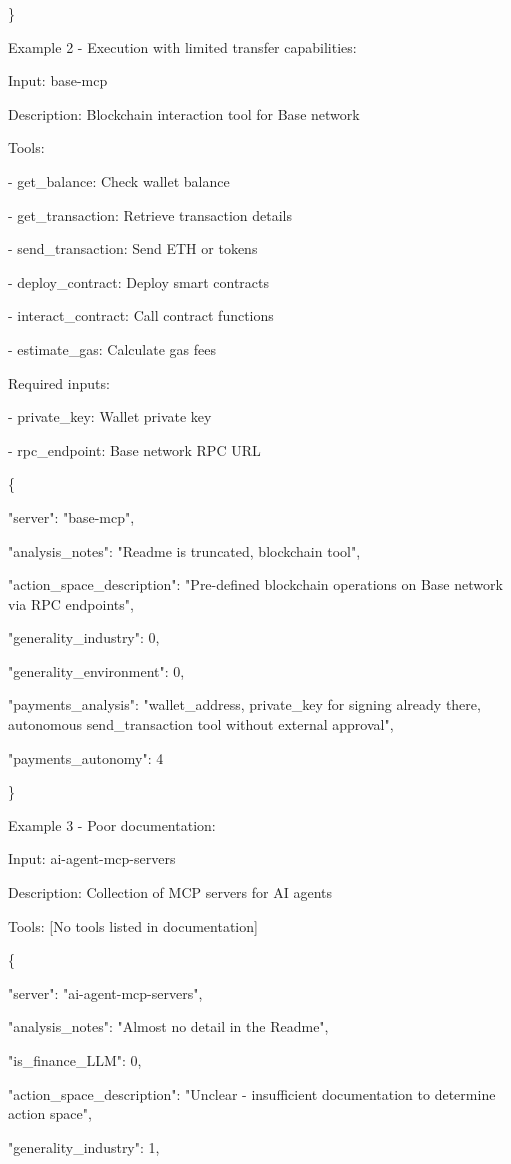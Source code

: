 \documentclass[manuscript,screen,nonacm,oneside]{acmart}
\begin{document}
\}

Example 2 - Execution with limited transfer capabilities:

Input: base-mcp

Description: Blockchain interaction tool for Base network

Tools:

- get\_balance: Check wallet balance

- get\_transaction: Retrieve transaction details

- send\_transaction: Send ETH or tokens

- deploy\_contract: Deploy smart contracts

- interact\_contract: Call contract functions

- estimate\_gas: Calculate gas fees

Required inputs:

- private\_key: Wallet private key

- rpc\_endpoint: Base network RPC URL

\{

"server": "base-mcp",

"analysis\_notes": "Readme is truncated, blockchain tool",

"action\_space\_description": "Pre-defined blockchain operations on Base network via RPC endpoints",

"generality\_industry": 0,

"generality\_environment": 0,

"payments\_analysis": "wallet\_address, private\_key for signing already there, autonomous send\_transaction tool without external approval",

"payments\_autonomy": 4

\}

Example 3 - Poor documentation:

Input: ai-agent-mcp-servers

Description: Collection of MCP servers for AI agents

Tools: {[}No tools listed in documentation{]}

\{

"server": "ai-agent-mcp-servers",

"analysis\_notes": "Almost no detail in the Readme",

"is\_finance\_LLM": 0,

"action\_space\_description": "Unclear - insufficient documentation to determine action space",

"generality\_industry": 1,
\end{document}
